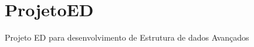 \chapter{Projeto\+ED}
\hypertarget{md__e_1_2_c_2_projeto_fase1_2_r_e_a_d_m_e}{}\label{md__e_1_2_c_2_projeto_fase1_2_r_e_a_d_m_e}
\label{md__e_1_2_c_2_projeto_fase1_2_r_e_a_d_m_e_autotoc_md0}%
%
Projeto ED para desenvolvimento de Estrutura de dados Avançados 